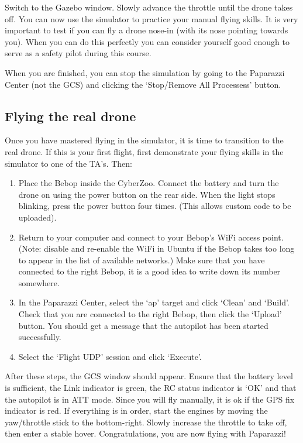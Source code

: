 \documentclass{article}
\begin{document}
Switch to the Gazebo window. Slowly advance the throttle until the drone takes off.
You can now use the simulator to practice your manual flying skills. It is very important to test if you can fly a drone nose-in (with its nose pointing towards you). When you can do this perfectly you can consider yourself good enough to serve as a safety pilot during this course.

When you are finished, you can stop the simulation by going to the Paparazzi Center (not the GCS) and clicking the `Stop/Remove All Processess' button.



\subsection{Flying the real drone}
Once you have mastered flying in the simulator, it is time to transition to the real drone.
If this is your first flight, first demonstrate your flying skills in the simulator to one of the TA's.
Then:

\begin{enumerate}
\item Place the Bebop inside the CyberZoo. Connect the battery and turn the drone on using the power button on the rear side. When the light stops blinking, press the power button four times. (This allows custom code to be uploaded).
\item Return to your computer and connect to your Bebop's WiFi access point. (Note: disable and re-enable the WiFi in Ubuntu if the Bebop takes too long to appear in the list of available networks.)
Make sure that you have connected to the right Bebop, it is a good idea to write down its number somewhere.
\item In the Paparazzi Center, select the `ap' target and click `Clean' and `Build'. Check that you are connected to the right Bebop, then click the `Upload' button. You should get a message that the autopilot has been started successfully.
\item Select the `Flight UDP' session and click `Execute'.
\end{enumerate}

After these steps, the GCS window should appear.
Ensure that the battery level is sufficient, the Link indicator is green, the RC status indicator is `OK' and that the autopilot is in ATT mode. Since you will fly manually, it is ok if the GPS fix indicator is red.
If everything is in order, start the engines by moving the yaw/throttle stick to the bottom-right. Slowly increase the throttle to take off, then enter a stable hover. Congratulations, you are now flying with Paparazzi!
\end{document}
